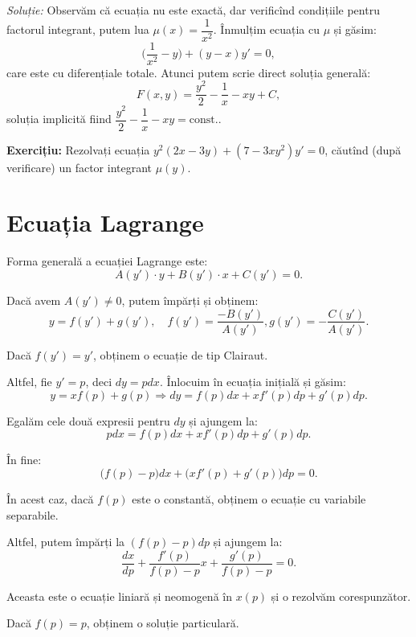\emph{Soluție:} Observăm că ecuația nu este exactă, dar verificînd condițiile pentru factorul
integrant, putem lua $\mu(x) = \dfrac{1}{x^2}$. Înmulțim ecuația cu $\mu$ și găsim:
\[
  \Big( \frac{1}{x^2} - y \Big) + (y - x)y' = 0,
\]
care este cu diferențiale totale. Atunci putem scrie direct soluția generală:
\[
  F(x, y) = \frac{y^2}{2} - \frac{1}{x} - xy + C,
\]
soluția implicită fiind $\dfrac{y^2}{2} - \dfrac{1}{x} - xy = \text{const.}$.

\vspace{0.5cm}

\textbf{Exercițiu:} Rezolvați ecuația $y^2 (2x - 3y) + (7 - 3xy^2) y' = 0$, căutînd
(după verificare) un factor integrant $\mu(y)$.


\section{Ecuația Lagrange}
\label{sec:lagr}

Forma generală a ecuației Lagrange este:
\[
  A(y')\cdot y + B(y')\cdot x + C(y') = 0.
\]

Dacă avem $A(y') \neq 0$, putem împărți și obținem:
\[
  y = f(y') + g(y'), \quad f(y') = \frac{- B(y')}{A(y')}, g(y') = -\frac{C(y')}{A(y')}.
\]

Dacă $f(y') = y'$, obținem o ecuație de tip Clairaut.

Altfel, fie $y' = p$, deci $dy = pdx$. Înlocuim în ecuația inițială și găsim:
\[
  y = xf(p) + g(p) \Rightarrow dy = f(p) dx + xf'(p) dp + g'(p) dp.
\]

Egalăm cele două expresii pentru $dy$ și ajungem la:
\[
  pdx = f(p) dx + xf'(p) dp + g'(p) dp.
\]

În fine:
\[
  \big( f(p) - p \big) dx + \big( xf'(p) + g'(p) \big) dp = 0.
\]

În acest caz, dacă $f(p)$ este o constantă, obținem o ecuație cu variabile separabile.

Altfel, putem împărți la $(f(p) - p) dp$ și ajungem la:
\[
  \frac{dx}{dp} + \frac{f'(p)}{f(p) - p} x + \frac{g'(p)}{f(p) - p} = 0.
\]

Aceasta este o ecuație liniară și neomogenă în $x(p)$ și o rezolvăm corespunzător.

Dacă $f(p) = p$, obținem o soluție particulară.

\vspace{0.5cm}

